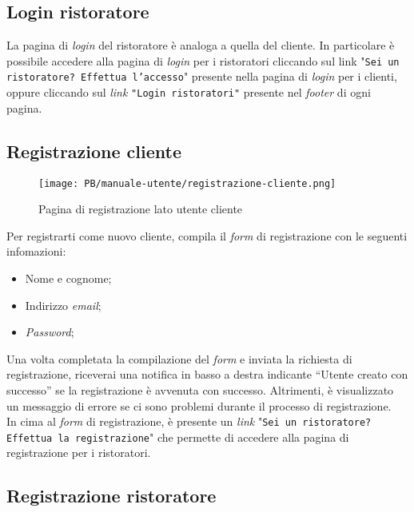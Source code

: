\subsection{Login ristoratore}

La pagina di \textit{login} del ristoratore è analoga a quella del cliente. In
particolare è possibile accedere alla pagina di \textit{login} per i ristoratori 
cliccando sul link "\texttt{Sei un ristoratore? Effettua l'accesso}" presente 
nella pagina di \textit{login} per i clienti, oppure cliccando sul \textit{link} 
\texttt{"Login ristoratori"} presente nel \textit{footer} di ogni pagina.

\subsection{Registrazione cliente}

\begin{figure}[htbp]
    \centering
	\texttt{[image: PB/manuale-utente/registrazione-cliente.png]}
    \caption{Pagina di registrazione lato utente cliente}
\end{figure}

Per registrarti come nuovo cliente, compila il \textit{form} di registrazione con le
seguenti infomazioni:

\begin{itemize}
	\item Nome e cognome;
	\item Indirizzo \textit{email};
	\item \textit{Password};
\end{itemize}

Una volta completata la compilazione del \textit{form} e inviata la richiesta di registrazione, riceverai 
una notifica in basso a destra indicante 
``Utente creato con successo'' se la registrazione è avvenuta con successo.
Altrimenti, è visualizzato un messaggio di errore se ci sono problemi durante il
processo di registrazione.\\
In cima al \textit{form} di registrazione, è presente un \textit{link} "\texttt{Sei un ristoratore? Effettua la registrazione}" che permette di accedere alla pagina di
registrazione per i ristoratori.



\subsection{Registrazione ristoratore}


